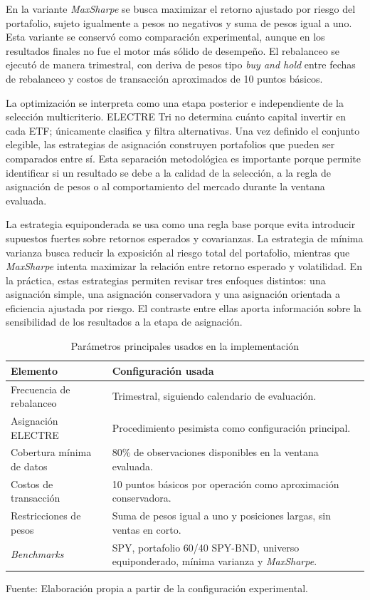 \documentclass[12pt,letterpaper]{article}
\newcommand{\fuente}[1]{\begin{center}\small Fuente: #1\end{center}}
\begin{document}
En la variante \textit{MaxSharpe} se busca maximizar el retorno ajustado por riesgo del portafolio, sujeto igualmente a pesos no negativos y suma de pesos igual a uno. Esta variante se conservó como comparación experimental, aunque en los resultados finales no fue el motor más sólido de desempeño. El rebalanceo se ejecutó de manera trimestral, con deriva de pesos tipo \textit{buy and hold} entre fechas de rebalanceo y costos de transacción aproximados de 10 puntos básicos.

La optimización se interpreta como una etapa posterior e independiente de la selección multicriterio. ELECTRE Tri no determina cuánto capital invertir en cada ETF; únicamente clasifica y filtra alternativas. Una vez definido el conjunto elegible, las estrategias de asignación construyen portafolios que pueden ser comparados entre sí. Esta separación metodológica es importante porque permite identificar si un resultado se debe a la calidad de la selección, a la regla de asignación de pesos o al comportamiento del mercado durante la ventana evaluada.

La estrategia equiponderada se usa como una regla base porque evita introducir supuestos fuertes sobre retornos esperados y covarianzas. La estrategia de mínima varianza busca reducir la exposición al riesgo total del portafolio, mientras que \textit{MaxSharpe} intenta maximizar la relación entre retorno esperado y volatilidad. En la práctica, estas estrategias permiten revisar tres enfoques distintos: una asignación simple, una asignación conservadora y una asignación orientada a eficiencia ajustada por riesgo. El contraste entre ellas aporta información sobre la sensibilidad de los resultados a la etapa de asignación.


\begin{table}[H]
\centering
\caption{Parámetros principales usados en la implementación}
\label{tab:parametros_implementacion}
\begin{tabular}{p{5cm}p{8cm}}
\toprule
\textbf{Elemento} & \textbf{Configuración usada} \\
\midrule
Frecuencia de rebalanceo & Trimestral, siguiendo calendario de evaluación. \\
Asignación ELECTRE & Procedimiento pesimista como configuración principal. \\
Cobertura mínima de datos & 80\% de observaciones disponibles en la ventana evaluada. \\
Costos de transacción & 10 puntos básicos por operación como aproximación conservadora. \\
Restricciones de pesos & Suma de pesos igual a uno y posiciones largas, sin ventas en corto. \\
\textit{Benchmarks} & SPY, portafolio 60/40 SPY-BND, universo equiponderado, mínima varianza y \textit{MaxSharpe}. \\
\bottomrule
\end{tabular}
\end{table}
\fuente{Elaboración propia a partir de la configuración experimental.}
\end{document}
